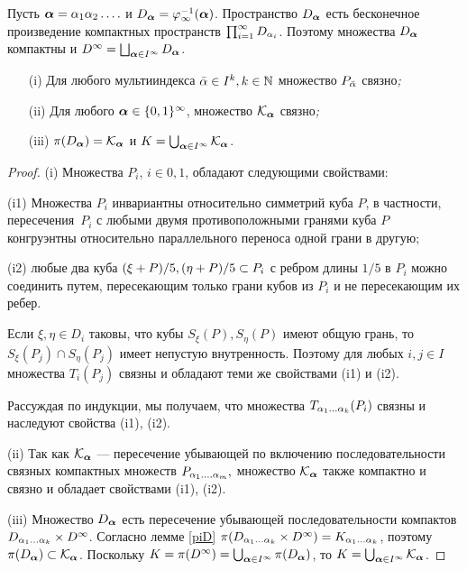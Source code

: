 Пусть ${\bm{\alpha}}=\alpha_1\alpha_2\ldots.$ и $D_{\bm{\alpha}}=\varphi_\infty^{-1}({\bm{\alpha}})$. 
Пространство $D_{\bm{\alpha}}$ есть бесконечное произведение компактных пространств $\prod_{i=1}^\infty D_{\alpha_i}$.
Поэтому множества $D_{\bm{\alpha}}$ компактны и $D^\infty=\bigsqcup_{{\bm{\alpha}}\in I^\infty}D_{\bm{\alpha}}$.
\begin{lemma}\label{svyaz}
\begin{itemize}[nolistsep]
\item[{\rm (i)}]  Для любого мультииндекса $\bar{\alpha}\in I^k, k\in\mathbb{N}$ множество   $P_{\bar{\alpha}}$ связно\emph{;}
\item[{\rm (ii)}] Для любого ${\bm{\alpha}}\in\{0,1\}^\infty$, множество ${\mathcal K}_{\bm{\alpha}}$ связно\emph{;}
\item[{\rm (iii)}] $\pi(D_{\bm{\alpha}})={\mathcal K}_{\bm{\alpha}}$ и $K=\bigcup_{{\bm{\alpha}}\in I^\infty}{\mathcal K}_{\bm{\alpha}}$.
\end{itemize}
\end{lemma}

\begin{proof}
(i) Множества $P_i$,  $i\in{0,1}$, обладают следующими  свойствами:\smallskip

(i1)  Множества $P_i$ инвариантны относительно симметрий куба $P$, в частности, пересечения~$P_i$ с любыми двумя противоположными гранями куба $P$ конгруэнтны относительно параллельного переноса одной грани в другую;\smallskip

(i2) любые два куба $(\xi+P)/5, (\eta+P)/5 \subset P_i$ с ребром длины $1/5$ в $P_i$ можно соединить путем, пересекающим только грани кубов из $P_i$ и не пересекающим их ребер.\smallskip

Если $\xi,\eta\in D_i$ таковы, что кубы $S_\xi(P), S_\eta(P)$ имеют общую грань, то $S_\xi(P_j)\cap S_\eta(P_j)$ имеет непустую внутренность.  
Поэтому для любых $i,j\in I$ множества $T_i(P_j)$ связны  и обладают теми же свойствами (i1) и (i2).

Рассуждая по индукции, мы получаем, что множества $T_{\alpha_1\ldots\alpha_k} (P_i)$ связны и наследуют  свойства (i1), (i2).\smallskip

(ii) Так как ${\mathcal K}_{\bm{\alpha}}$ --- пересечение убывающей по включению последовательности связных компактных множеств $P_{\alpha_1\ldots.\alpha_m},$  множество ${\mathcal K}_{\bm{\alpha}}$ также компактно и связно и обладает свойствами (i1), (i2).\smallskip

(iii) Множество $D_{\bm{\alpha}}$ есть пересечение убывающей последовательности компактов
$D_{\alpha_1\ldots\alpha_k}\times D^\infty$. Согласно лемме  \ref{piD} $\pi(D_{\alpha_1\ldots\alpha_k}\times D^\infty)=K_{\alpha_1\ldots\alpha_k} $,  поэтому $\pi(D_{\bm{\alpha}})\subset {\mathcal K}_{\bm{\alpha}}$. Поскольку $K=\pi(D^\infty)=\bigcup_{{\bm{\alpha}}\in I^\infty}\pi(D_{\bm{\alpha}})$, то $K=\bigcup_{{\bm{\alpha}}\in I^\infty}{\mathcal K}_{\bm{\alpha}}$.
\end{proof}


